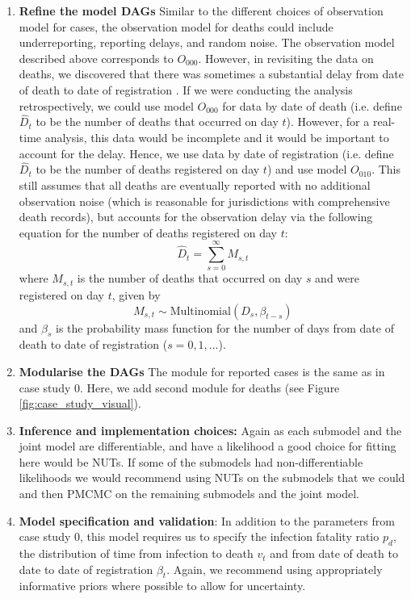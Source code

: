\documentclass{article}
\begin{document}
\begin{enumerate}
\item \textbf{Refine the model DAGs}       
    Similar to the different choices of observation model for cases, the observation model for deaths could include underreporting, reporting delays, and random noise. The observation model described above corresponds to $O_{000}$. However, in revisiting the data on deaths, we discovered that there was sometimes a substantial delay from date of death to date of registration \citep{seaman2022nowcasting}. If we were conducting the analysis retrospectively, we could use model $O_{000}$ for data by date of death (i.e. define $\hat{D}_t$ to be the number of deaths that occurred on day $t$). However, for a real-time analysis, this data would be incomplete and it would be important to account for the delay. Hence, we use data by date of registration (i.e. define $\hat{D}_t$ to be the number of deaths registered on day $t$) and use model $O_{010}$. This still assumes that all deaths are eventually reported with no additional observation noise (which is reasonable for jurisdictions with comprehensive death records), but accounts for the observation delay via the following equation for the number of deaths registered on day $t$:
\begin{equation}
    \hat{D}_t = \sum_{s=0}^\infty M_{s,t}
\end{equation}
where $M_{s,t}$ is the number of deaths that occurred on day $s$ and were registered on day $t$, given by
\begin{equation}
    M_{s,t} \sim \mathrm{Multinomial}\left( D_s, \beta_{t-s}\right) 
\end{equation}
and $\beta_s$ is the probability mass function for the number of days from date of death to date of registration ($s=0,1,\ldots$).

 \item \textbf{Modularise the DAGs} The module for reported cases is the same as in case study 0. Here, we add second module for deaths (see Figure \ref{fig:case_study_visual}).

\item \textbf{Inference and implementation choices:} Again as  each submodel and the joint model are differentiable, and have a likelihood a good choice for fitting here would be NUTs. If some of the submodels had non-differentiable likelihoods we would recommend using NUTs on the submodels that we could and then PMCMC on the remaining submodels and the joint model.

\item \textbf{Model specification and validation}: In addition to the parameters from case study 0, this model requires us to specify the infection fatality ratio $p_d$, the distribution of time from infection to death $v_t$ and from date of death to date to date of registration $\beta_t$. Again, we recommend using appropriately informative priors where possible to allow for uncertainty. 



\end{enumerate}
\end{document}
